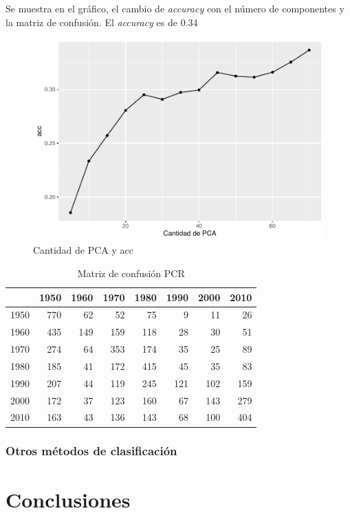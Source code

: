 \documentclass[conference,final,]{IEEEtran}
\begin{document}
Se muestra en el gráfico, el cambio de \emph{accuracy} con el número de
componentes y la matriz de confusión. El \emph{accuracy} es de 0.34

\begin{figure}[H]

{\centering \includegraphics[width=0.6\linewidth]{YearPrediction_Reporte_files/figure-latex/unnamed-chunk-19-1} 

}

\caption{Cantidad de PCA y acc}\label{fig:unnamed-chunk-19}
\end{figure}

\begin{table}[!t]
\centering
\caption{Matriz de confusión PCR} 
\begin{tabular}{r|rrrrrrr}
  \hline
 & 1950 & 1960 & 1970 & 1980 & 1990 & 2000 & 2010 \\ 
  \hline
1950 & 770 &  62 &  52 &  75 &   9 &  11 &  26 \\ 
  1960 & 435 & 149 & 159 & 118 &  28 &  30 &  51 \\ 
  1970 & 274 &  64 & 353 & 174 &  35 &  25 &  89 \\ 
  1980 & 185 &  41 & 172 & 415 &  45 &  35 &  83 \\ 
  1990 & 207 &  44 & 119 & 245 & 121 & 102 & 159 \\ 
  2000 & 172 &  37 & 123 & 160 &  67 & 143 & 279 \\ 
  2010 & 163 &  43 & 136 & 143 &  68 & 100 & 404 \\ 
   \hline
\end{tabular}
\end{table}

\hypertarget{otros-metodos-de-clasificacion}{%
\subsubsection{Otros métodos de
clasificación}\label{otros-metodos-de-clasificacion}}

\hypertarget{conclusiones}{%
\section{Conclusiones}\label{conclusiones}}
\end{document}
